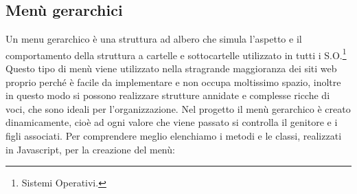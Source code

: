 \documentclass[a4paper,11pt]{article}
\begin{document}
\subsection{Menù gerarchici}
\label{sec:5.1}
Un menu gerarchico è una struttura ad albero che simula l'aspetto e il comportamento della struttura a cartelle e sottocartelle utilizzato in tutti i S.O.\footnote{Sistemi Operativi.} Questo tipo di menù viene utilizzato nella stragrande maggioranza dei siti web proprio perché è facile da implementare e non occupa moltissimo spazio, inoltre in questo modo si possono realizzare strutture annidate e complesse ricche di voci, che sono ideali per l'organizzazione.\newline 
Nel progetto il menù gerarchico è creato dinamicamente, cioè ad ogni valore che viene passato si controlla il genitore e i figli associati.
Per comprendere meglio elenchiamo i metodi e le classi, realizzati in Javascript, per la creazione del menù:
\end{document}

